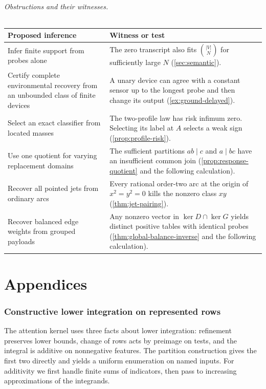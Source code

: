 \documentclass[11pt,a4paper]{article}
\theoremstyle{definition}
\theoremstyle{remark}\newaliascnt{remark}{theorem}
\numberwithin{equation}{section}
\begin{document}
\paragraph{Obstructions and their witnesses.}
\begin{center}
\small
\begin{tabular}{@{}p{.36\linewidth}p{.59\linewidth}@{}}
\toprule
Proposed inference & Witness or test\\
\midrule
Infer finite support from probes alone &
The zero transcript also fits \(\binom{|V|}{N}\) for sufficiently large \(N\) (\cref{sec:semantic}).\\[2pt]
Certify complete environmental recovery from an unbounded class of finite devices &
A unary device can agree with a constant sensor up to the longest probe and then change its output (\cref{ex:ground-delayed}).\\[2pt]
Select an exact classifier from located masses &
The two-profile law has risk infimum zero. Selecting its label at \(A\) selects a weak sign (\cref{prop:profile-risk}).\\[2pt]
Use one quotient for varying replacement domains &
The sufficient partitions \(ab\mid c\) and \(a\mid bc\) have an insufficient common join (\cref{prop:response-quotient} and the following calculation).\\[2pt]
Recover all pointed jets from ordinary arcs &
Every rational order-two arc at the origin of \(x^2=y^2=0\) kills the nonzero class \(xy\) (\cref{thm:jet-pairing}).\\[2pt]
Recover balanced edge weights from grouped payloads &
Any nonzero vector in \(\ker D\cap\ker G\) yields distinct positive tables with identical probes (\cref{thm:global-balance-inverse} and the following calculation).\\
\bottomrule
\end{tabular}
\end{center}
\clearpage
\part*{Appendices}
\appendix

\section{Constructive lower integration on represented rows}\label{app:integration}

The attention kernel uses three facts about lower integration: refinement preserves lower bounds, change of rows acts by preimage on tests, and the integral is additive on nonnegative features. The partition construction gives the first two directly and yields a uniform enumeration on named inputs. For additivity we first handle finite sums of indicators, then pass to increasing approximations of the integrands.
\end{document}
